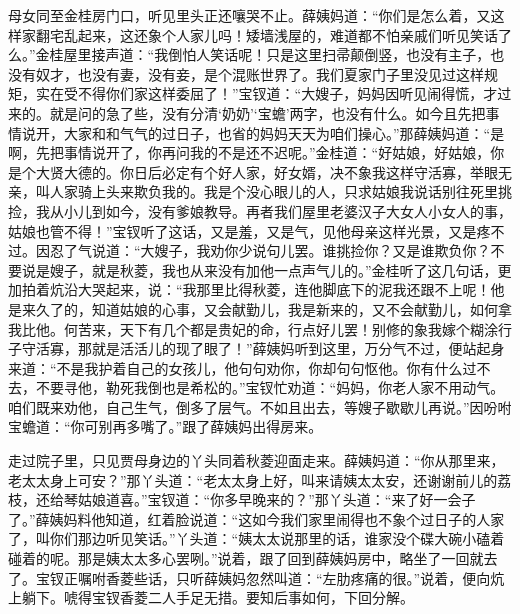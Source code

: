 \begin{parag}
    母女同至金桂房门口，听见里头正还嚷哭不止。薛姨妈道：“你们是怎么着，又这样家翻宅乱起来，这还象个人家儿吗！矮墙浅屋的，难道都不怕亲戚们听见笑话了么。”金桂屋里接声道：“我倒怕人笑话呢！只是这里扫帚颠倒竖，也没有主子，也没有奴才，也没有妻，没有妾，是个混账世界了。我们夏家门子里没见过这样规矩，实在受不得你们家这样委屈了！”宝钗道：“大嫂子，妈妈因听见闹得慌，才过来的。就是问的急了些，没有分清‘奶奶’‘宝蟾’两字，也没有什么。如今且先把事情说开，大家和和气气的过日子，也省的妈妈天天为咱们操心。”那薛姨妈道：“是啊，先把事情说开了，你再问我的不是还不迟呢。”金桂道：“好姑娘，好姑娘，你是个大贤大德的。你日后必定有个好人家，好女婿，决不象我这样守活寡，举眼无亲，叫人家骑上头来欺负我的。我是个没心眼儿的人，只求姑娘我说话别往死里挑捡，我从小儿到如今，没有爹娘教导。再者我们屋里老婆汉子大女人小女人的事，姑娘也管不得！”宝钗听了这话，又是羞，又是气，见他母亲这样光景，又是疼不过。因忍了气说道：“大嫂子，我劝你少说句儿罢。谁挑捡你？又是谁欺负你？不要说是嫂子，就是秋菱，我也从来没有加他一点声气儿的。”金桂听了这几句话，更加拍着炕沿大哭起来，说：“我那里比得秋菱，连他脚底下的泥我还跟不上呢！他是来久了的，知道姑娘的心事，又会献勤儿，我是新来的，又不会献勤儿，如何拿我比他。何苦来，天下有几个都是贵妃的命，行点好儿罢！别修的象我嫁个糊涂行子守活寡，那就是活活儿的现了眼了！”薛姨妈听到这里，万分气不过，便站起身来道：“不是我护着自己的女孩儿，他句句劝你，你却句句怄他。你有什么过不去，不要寻他，勒死我倒也是希松的。”宝钗忙劝道：“妈妈，你老人家不用动气。咱们既来劝他，自己生气，倒多了层气。不如且出去，等嫂子歇歇儿再说。”因吩咐宝蟾道：“你可别再多嘴了。”跟了薛姨妈出得房来。
\end{parag}


\begin{parag}
    走过院子里，只见贾母身边的丫头同着秋菱迎面走来。薛姨妈道：“你从那里来，老太太身上可安？”那丫头道：“老太太身上好，叫来请姨太太安，还谢谢前儿的荔枝，还给琴姑娘道喜。”宝钗道：“你多早晚来的？”那丫头道：“来了好一会子了。”薛姨妈料他知道，红着脸说道：“这如今我们家里闹得也不象个过日子的人家了，叫你们那边听见笑话。”丫头道：“姨太太说那里的话，谁家没个碟大碗小磕着碰着的呢。那是姨太太多心罢咧。”说着，跟了回到薛姨妈房中，略坐了一回就去了。宝钗正嘱咐香菱些话，只听薛姨妈忽然叫道：“左肋疼痛的很。”说着，便向炕上躺下。唬得宝钗香菱二人手足无措。要知后事如何，下回分解。
\end{parag}